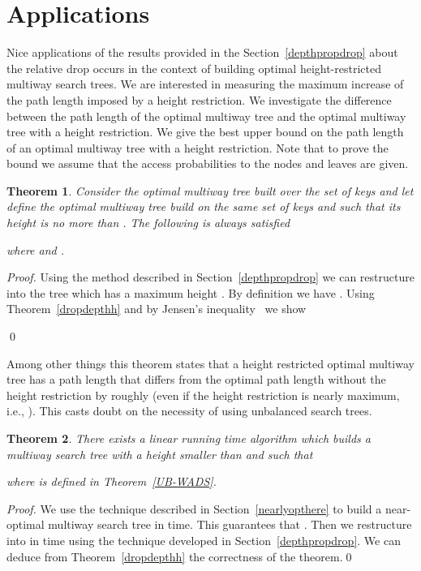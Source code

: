 \documentclass{llncs}\usepackage[english]{babel}
\newtheorem{thm}{Theorem}
\begin{document}
\section{Applications}
\label{upperheight}
Nice applications of the results provided in the Section~\ref{depthpropdrop} about the relative drop occurs in the context of building optimal height-restricted multiway search trees. We are interested in measuring the maximum increase of the path length imposed by a height restriction. We investigate the difference between the path length of the optimal multiway tree and the optimal multiway tree with a height restriction. We give the best upper bound on the path length of an optimal multiway tree with a height restriction. Note that to prove the bound we assume that the access probabilities to the nodes and leaves are given. 

\begin{thm}
Consider  the optimal multiway tree built over the set of keys  and let  define the optimal multiway tree build on the same set of keys and such that its height is no more than . The following is always satisfied
\vspace{-0.1cm}

where  and .
\end{thm}
\begin{proof}
Using the method described in Section~\ref{depthpropdrop} we can restructure  into the tree  which has a maximum height . By definition we have . Using Theorem~\ref{dropdepthh} and by Jensen's inequality~\cite{Jensen} we show
\vspace{-0.2cm}

\qed 
\vspace{-0.2cm}
\end{proof}

Among other things this theorem states that a height restricted optimal multiway tree has a path length that differs from the optimal path length  without the height restriction by roughly  (even if the height restriction is nearly maximum, i.e., ). This casts doubt on the necessity of using unbalanced search trees.

\begin{thm}
There exists a linear running time algorithm which builds a multiway search tree  with a height smaller than  and such that  
 
where  is defined in Theorem~\ref{UB-WADS}.
\end{thm}
\begin{proof}
We use the technique described in Section~\ref{nearlyopthere} to build a near-optimal multiway search tree  in  time. This guarantees that . Then we restructure  into  in  time using the technique developed in Section~\ref{depthpropdrop}. We can deduce from Theorem~\ref{dropdepthh} the correctness of the theorem.\qed \end{proof}
\end{document}
